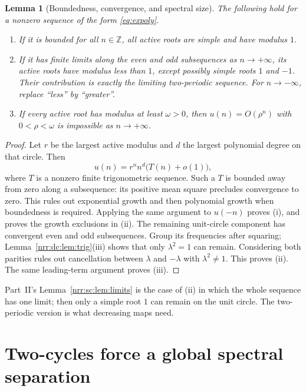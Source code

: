 \documentclass[11pt,letterpaper]{article}
\newtheorem{lemma}[theorem]{Lemma}
\theoremstyle{definition}
\theoremstyle{remark}
\newcommand{\Z}{\mathbb Z}
\begin{document}
\begin{lemma}[Boundedness, convergence, and spectral size]
\label{nrr:dc:lem:limits}
The following hold for a nonzero sequence of the form \eqref{eq:expoly}.
\begin{enumerate}[label=(\roman*),itemsep=2pt]
\item If it is bounded for all $n\in\Z$, all active roots are simple
and have modulus $1$.
\item If it has finite limits along the even and odd subsequences as
$n\to+\infty$, its active roots have modulus less than $1$, except
possibly simple roots $1$ and $-1$. Their contribution is exactly the
limiting two-periodic sequence. For $n\to-\infty$, replace ``less''
by ``greater''.
\item If every active root has modulus at least $\omega>0$,
then $u(n)=O(\rho^n)$ with $0<\rho<\omega$ is impossible as
$n\to+\infty$.
\end{enumerate}
\end{lemma}
\begin{proof}
Let $r$ be the largest active modulus and $d$ the largest polynomial
degree on that circle. Then
\[
 u(n)=r^n n^d\bigl(T(n)+o(1)\bigr),
\]
where $T$ is a nonzero finite trigonometric sequence. Such a $T$ is
bounded away from zero along a subsequence: its positive mean square
precludes convergence to zero. This rules out exponential growth and
then polynomial growth when boundedness is required. Applying the same
argument to $u(-n)$ proves (i), and proves the growth exclusions in (ii).
The remaining unit-circle component has convergent even and odd
subsequences. Group its frequencies after squaring;
Lemma~\ref{nrr:dc:lem:trig}(iii) shows that only $\lambda^2=1$ can remain.
Considering both parities rules out cancellation between $\lambda$ and
$-\lambda$ with $\lambda^2\ne1$. This proves (ii). The same leading-term
argument proves (iii).
\end{proof}

Part~II's Lemma~\ref{nrr:sc:lem:limits} is the case of (ii) in which the whole
sequence has one limit; then only a simple root $1$ can remain on the unit
circle. The two-periodic version is what decreasing maps need.

\section{Two-cycles force a global spectral separation}
\label{nrr:dc:sec:geometry}
\end{document}
